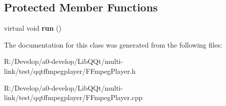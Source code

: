 \subsection*{Protected Member Functions}
\begin{DoxyCompactItemize}
\item 
\mbox{\label{class_f_fmpeg_player_a17823794c6ef0cca44b8980513e160f5}} 
virtual void {\bfseries run} ()
\end{DoxyCompactItemize}


The documentation for this class was generated from the following files\+:\begin{DoxyCompactItemize}
\item 
R\+:/\+Develop/a0-\/develop/\+Lib\+Q\+Qt/multi-\/link/test/qqtffmpegplayer/F\+Fmpeg\+Player.\+h\item 
R\+:/\+Develop/a0-\/develop/\+Lib\+Q\+Qt/multi-\/link/test/qqtffmpegplayer/F\+Fmpeg\+Player.\+cpp\end{DoxyCompactItemize}
